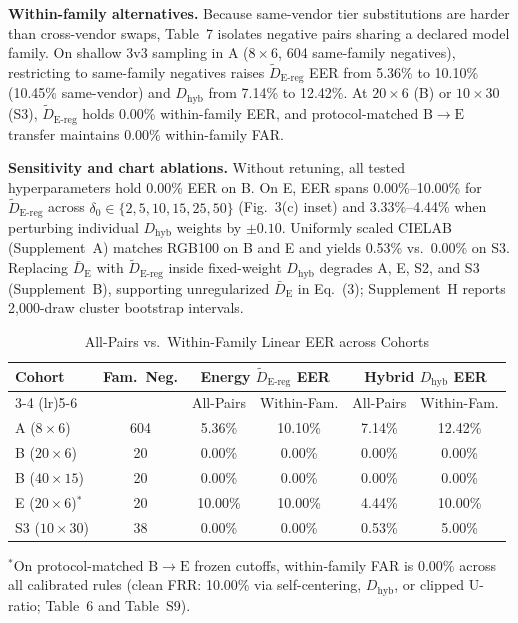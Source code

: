 \documentclass[10pt,journal,compsoc]{IEEEtran}
\newcommand{\Denergy}{\bar D_{\mathrm E}}
\newcommand{\Dereg}{\tilde D_{\mathrm{E\mbox{-}reg}}}
\newcommand{\Dhyb}{D_{\mathrm{hyb}}}
\begin{document}
\textbf{Within-family alternatives.} Because same-vendor tier substitutions are harder than cross-vendor swaps, Table~7 isolates negative pairs sharing a declared model family. On shallow 3v3 sampling in A ($8\times 6$, 604 same-family negatives), restricting to same-family negatives raises $\Dereg{}$ EER from 5.36\% to 10.10\% (10.45\% same-vendor) and $\Dhyb{}$ from 7.14\% to 12.42\%. At $20\times 6$ (B) or $10\times 30$ (S3), $\Dereg{}$ holds 0.00\% within-family EER, and protocol-matched $\mathrm{B}\rightarrow\mathrm{E}$ transfer maintains 0.00\% within-family FAR.

\textbf{Sensitivity and chart ablations.} Without retuning, all tested hyperparameters hold 0.00\% EER on B. On E, EER spans 0.00\%--10.00\% for $\Dereg{}$ across $\delta_0 \in \{2, 5, 10, 15, 25, 50\}$ (Fig.~3(c) inset) and 3.33\%--4.44\% when perturbing individual $\Dhyb{}$ weights by $\pm 0.10$. Uniformly scaled CIELAB (Supplement~A) matches RGB100 on B and E and yields 0.53\% vs.\ 0.00\% on S3. Replacing $\Denergy{}$ with $\Dereg{}$ inside fixed-weight $\Dhyb{}$ degrades A, E, S2, and S3 (Supplement~B), supporting unregularized $\Denergy{}$ in Eq.~(3); Supplement~H reports 2,000-draw cluster bootstrap intervals.

\begin{table}[t]
\centering
\caption{All-Pairs vs.\ Within-Family Linear EER across Cohorts}
\label{tab:within_family}
\footnotesize\setlength{\tabcolsep}{1.5pt}\renewcommand{\arraystretch}{1.05}
\begin{tabular*}{\columnwidth}{@{\extracolsep{\fill}}lccccc@{}}
\toprule
Cohort & Fam.\ Neg. & \multicolumn{2}{c}{Energy $\Dereg{}$ EER} & \multicolumn{2}{c}{Hybrid $\Dhyb{}$ EER} \\
\cmidrule(lr){3-4} \cmidrule(lr){5-6}
 & & All-Pairs & Within-Fam. & All-Pairs & Within-Fam. \\
\midrule
A ($8\times 6$) & 604 & 5.36\% & 10.10\% & 7.14\% & 12.42\% \\
B ($20\times 6$) & 20 & 0.00\% & 0.00\% & 0.00\% & 0.00\% \\
B ($40\times 15$) & 20 & 0.00\% & 0.00\% & 0.00\% & 0.00\% \\
E ($20\times 6$)$^*$ & 20 & 10.00\% & 10.00\% & 4.44\% & 10.00\% \\
S3 ($10\times 30$) & 38 & 0.00\% & 0.00\% & 0.53\% & 5.00\% \\
\bottomrule
\end{tabular*}
\par\smallskip\footnotesize{$^*$On protocol-matched $\mathrm{B}\rightarrow\mathrm{E}$ frozen cutoffs, within-family FAR is 0.00\% across all calibrated rules (clean FRR: 10.00\% via self-centering, $\Dhyb{}$, or clipped U-ratio; Table~6 and Table~S9).}
\end{table}
\end{document}
